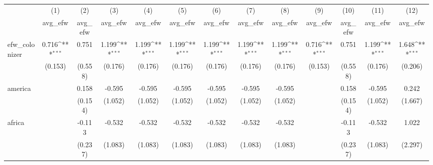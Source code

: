 {
\def\sym#1{\ifmmode^{#1}\else\(^{#1}\)\fi}
\begin{tabular}{l*{12}{c}}
\hline\hline
            &\multicolumn{1}{c}{(1)}&\multicolumn{1}{c}{(2)}&\multicolumn{1}{c}{(3)}&\multicolumn{1}{c}{(4)}&\multicolumn{1}{c}{(5)}&\multicolumn{1}{c}{(6)}&\multicolumn{1}{c}{(7)}&\multicolumn{1}{c}{(8)}&\multicolumn{1}{c}{(9)}&\multicolumn{1}{c}{(10)}&\multicolumn{1}{c}{(11)}&\multicolumn{1}{c}{(12)}\\
            &\multicolumn{1}{c}{avg\_efw}&\multicolumn{1}{c}{avg\_efw}&\multicolumn{1}{c}{avg\_efw}&\multicolumn{1}{c}{avg\_efw}&\multicolumn{1}{c}{avg\_efw}&\multicolumn{1}{c}{avg\_efw}&\multicolumn{1}{c}{avg\_efw}&\multicolumn{1}{c}{avg\_efw}&\multicolumn{1}{c}{avg\_efw}&\multicolumn{1}{c}{avg\_efw}&\multicolumn{1}{c}{avg\_efw}&\multicolumn{1}{c}{avg\_efw}\\
\hline
efw\_colonizer&       0.716\sym{***}&       0.751         &       1.199\sym{***}&       1.199\sym{***}&       1.199\sym{***}&       1.199\sym{***}&       1.199\sym{***}&       1.199\sym{***}&       0.716\sym{***}&       0.751         &       1.199\sym{***}&       1.648\sym{***}\\
            &     (0.153)         &     (0.558)         &     (0.176)         &     (0.176)         &     (0.176)         &     (0.176)         &     (0.176)         &     (0.176)         &     (0.153)         &     (0.558)         &     (0.176)         &     (0.206)         \\
[1em]
america     &                     &       0.158         &      -0.595         &      -0.595         &      -0.595         &      -0.595         &      -0.595         &      -0.595         &                     &       0.158         &      -0.595         &       0.242         \\
            &                     &     (0.154)         &     (1.052)         &     (1.052)         &     (1.052)         &     (1.052)         &     (1.052)         &     (1.052)         &                     &     (0.154)         &     (1.052)         &     (1.667)         \\
[1em]
africa      &                     &      -0.113         &      -0.532         &      -0.532         &      -0.532         &      -0.532         &      -0.532         &      -0.532         &                     &      -0.113         &      -0.532         &       1.022         \\
            &                     &     (0.237)         &     (1.083)         &     (1.083)         &     (1.083)         &     (1.083)         &     (1.083)         &     (1.083)         &                     &     (0.237)         &     (1.083)         &     (2.297)         \\

\end{tabular}}
